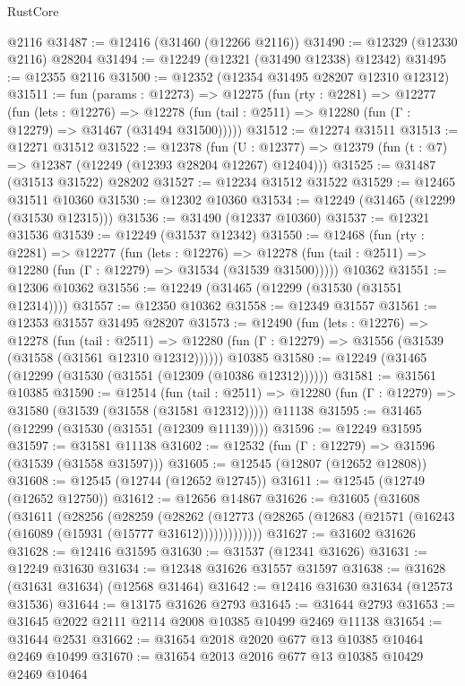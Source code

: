 \begin{lexlean}{RustCore}
\begin{coremodule}
    @2116
@31487 := @12416 (@31460 (@12266 @2116))
@31490 := @12329 (@12330 @2116) @28204
@31494 := @12249 (@12321 (@31490 @12338) @12342)
@31495 := @12355 @2116
@31500 := @12352 (@12354 @31495 @28207 @12310 @12312)
@31511 := fun (params : @12273) =>
  @12275
    (fun (rty : @2281) =>
    @12277
      (fun (lets : @12276) =>
      @12278 (fun (tail : @2511) => @12280 (fun (Γ : @12279) => @31467 (@31494 @31500)))))
@31512 := @12274 @31511
@31513 := @12271 @31512
@31522 := @12378
    (fun (U : @12377) => @12379 (fun (t : @7) => @12387 (@12249 (@12393 @28204 @12267) @12404)))
@31525 := @31487 (@31513 @31522) @28202
@31527 := @12234 @31512 @31522
@31529 := @12465 @31511 @10360
@31530 := @12302 @10360
@31534 := @12249 (@31465 (@12299 (@31530 @12315)))
@31536 := @31490 (@12337 @10360)
@31537 := @12321 @31536
@31539 := @12249 (@31537 @12342)
@31550 := @12468
    (fun (rty : @2281) =>
    @12277
      (fun (lets : @12276) =>
      @12278 (fun (tail : @2511) => @12280 (fun (Γ : @12279) => @31534 (@31539 @31500)))))
    @10362
@31551 := @12306 @10362
@31556 := @12249 (@31465 (@12299 (@31530 (@31551 @12314))))
@31557 := @12350 @10362
@31558 := @12349 @31557
@31561 := @12353 @31557 @31495 @28207
@31573 := @12490
    (fun (lets : @12276) =>
    @12278
      (fun (tail : @2511) =>
      @12280 (fun (Γ : @12279) => @31556 (@31539 (@31558 (@31561 @12310 @12312))))))
    @10385
@31580 := @12249 (@31465 (@12299 (@31530 (@31551 (@12309 (@10386 @12312))))))
@31581 := @31561 @10385
@31590 := @12514
    (fun (tail : @2511) => @12280 (fun (Γ : @12279) => @31580 (@31539 (@31558 (@31581 @12312)))))
    @11138
@31595 := @31465 (@12299 (@31530 (@31551 (@12309 @11139))))
@31596 := @12249 @31595
@31597 := @31581 @11138
@31602 := @12532 (fun (Γ : @12279) => @31596 (@31539 (@31558 @31597)))
@31605 := @12545 (@12807 (@12652 @12808))
@31608 := @12545 (@12744 (@12652 @12745))
@31611 := @12545 (@12749 (@12652 @12750))
@31612 := @12656 @14867
@31626 := @31605
    (@31608
      (@31611
        (@28256
          (@28259
            (@28262
              (@12773 (@28265 (@12683 (@21571 (@16243 (@16089 (@15931 (@15777 @31612)))))))))))))
@31627 := @31602 @31626
@31628 := @12416 @31595
@31630 := @31537 (@12341 @31626)
@31631 := @12249 @31630
@31634 := @12348 @31626 @31557 @31597
@31638 := @31628 (@31631 @31634) (@12568 @31464)
@31642 := @12416 @31630 @31634 (@12573 @31536)
@31644 := @13175 @31626 @2793
@31645 := @31644 @2793
@31653 := @31645 @2022 @2111 @2114 @2008 @10385 @10499 @2469 @11138
@31654 := @31644 @2531
@31662 := @31654 @2018 @2020 @677 @13 @10385 @10464 @2469 @10499
@31670 := @31654 @2013 @2016 @677 @13 @10385 @10429 @2469 @10464

\end{coremodule}
\end{lexlean}
